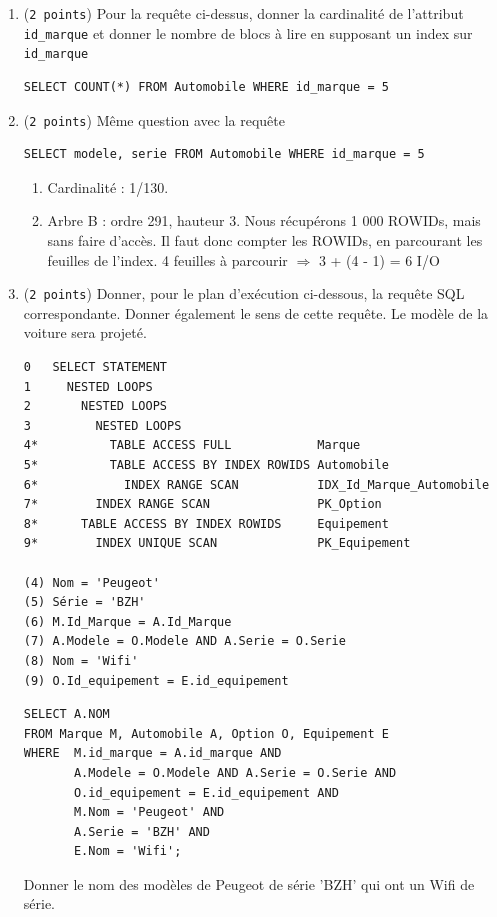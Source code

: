 \begin{enumerate}
  \item ({\tt 2~points})
  Pour la requête ci-dessus, donner la cardinalité de l'attribut {\tt id\_marque}
  et  donner le nombre de blocs à lire en supposant un index sur {\tt id\_marque} 


\begin{verbatim}
SELECT COUNT(*) FROM Automobile WHERE id_marque = 5
\end{verbatim}

  \item ({\tt 2~points}) Même question avec la requête 
  
\begin{verbatim}
SELECT modele, serie FROM Automobile WHERE id_marque = 5
\end{verbatim}

\begin{solution}
\begin{enumerate}
  \item Cardinalité : 1/130.
  \item Arbre B :  ordre 291, hauteur 3. Nous récupérons 1 000 ROWIDs, mais sans faire d'accès. Il faut donc compter les ROWIDs, en parcourant les feuilles de l'index. 4 feuilles à parcourir $\Rightarrow$ 3 + (4 - 1) = 6 I/O
\end{enumerate}
\end{solution}

  \item ({\tt 2~points}) Donner, pour le plan d'exécution ci-dessous, la requête SQL correspondante. 
   Donner également le sens de cette requête. Le modèle de la voiture sera projeté. 
\begin{verbatim}
0   SELECT STATEMENT
1     NESTED LOOPS
2       NESTED LOOPS
3         NESTED LOOPS
4*          TABLE ACCESS FULL            Marque
5*          TABLE ACCESS BY INDEX ROWIDS Automobile
6*            INDEX RANGE SCAN           IDX_Id_Marque_Automobile        
7*        INDEX RANGE SCAN               PK_Option
8*      TABLE ACCESS BY INDEX ROWIDS     Equipement
9*        INDEX UNIQUE SCAN              PK_Equipement

(4) Nom = 'Peugeot'
(5) Série = 'BZH'
(6) M.Id_Marque = A.Id_Marque
(7) A.Modele = O.Modele AND A.Serie = O.Serie 
(8) Nom = 'Wifi'
(9) O.Id_equipement = E.id_equipement
\end{verbatim}
\begin{solution}
\begin{verbatim}
SELECT A.NOM
FROM Marque M, Automobile A, Option O, Equipement E
WHERE  M.id_marque = A.id_marque AND
       A.Modele = O.Modele AND A.Serie = O.Serie AND
       O.id_equipement = E.id_equipement AND
       M.Nom = 'Peugeot' AND
       A.Serie = 'BZH' AND
       E.Nom = 'Wifi';
\end{verbatim}
Donner le nom des modèles de Peugeot de série 'BZH' qui ont un Wifi de série. 
\end{solution}


\end{enumerate}

